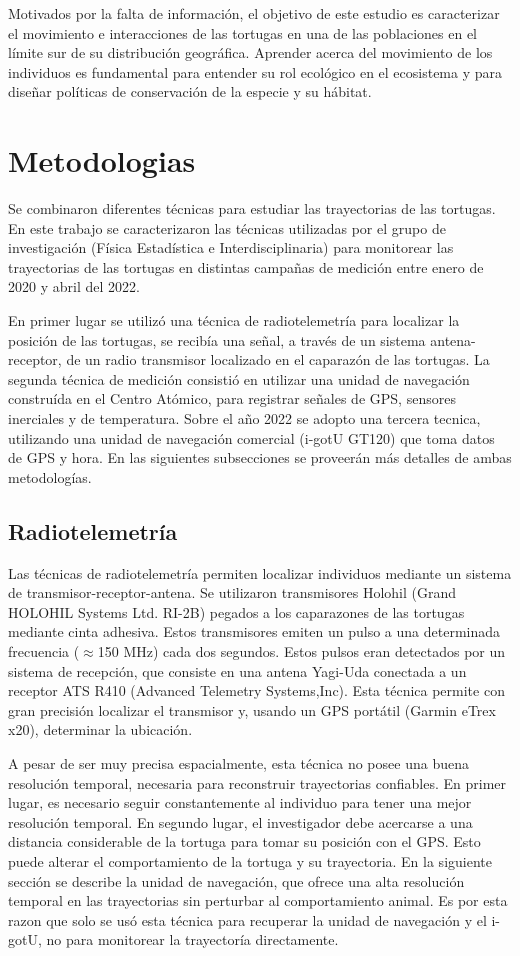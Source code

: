 Motivados por la falta de información, el objetivo de este estudio es caracterizar el movimiento e interacciones de las tortugas en una de las poblaciones en el límite sur de su distribución geográfica. Aprender acerca del movimiento de los individuos es fundamental para entender su rol ecológico en el ecosistema y para diseñar políticas de conservación de la especie y su hábitat.


\section{Metodologias}

Se combinaron diferentes técnicas para estudiar las trayectorias de las tortugas. En este trabajo se caracterizaron las técnicas utilizadas por el grupo de investigación (Física Estadística e Interdisciplinaria) para monitorear las trayectorias de las tortugas en distintas campañas de medición entre enero de 2020 y abril del 2022.
 
En primer lugar se utilizó una técnica de radiotelemetría para localizar la posición de las tortugas, se recibía una señal, a través de un sistema antena-receptor, de un radio transmisor localizado en el caparazón de las tortugas. La segunda técnica de medición consistió en utilizar una unidad de navegación construída en el Centro Atómico, para registrar señales de GPS, sensores inerciales y de temperatura. Sobre el año 2022 se adopto una tercera tecnica, utilizando una unidad de navegación comercial (i-gotU GT120) que toma datos de GPS y hora. En las siguientes subsecciones se proveerán más detalles de ambas metodologías. 
 
\subsection{Radiotelemetría}
Las técnicas de radiotelemetría permiten localizar individuos mediante un sistema de transmisor-receptor-antena. Se utilizaron transmisores Holohil (Grand HOLOHIL Systems Ltd. RI-2B) pegados a los caparazones de las tortugas mediante cinta adhesiva. Estos transmisores emiten un pulso a una determinada frecuencia ($\approx$150 MHz) cada dos segundos. Estos pulsos eran detectados por un sistema de recepción, que consiste en una antena Yagi-Uda conectada a un receptor ATS R410 (Advanced Telemetry Systems,Inc). Esta técnica permite con gran precisión localizar el transmisor y, usando un GPS portátil (Garmin eTrex
x20), determinar la ubicación.
 
A pesar de ser muy precisa espacialmente, esta técnica no posee una buena resolución temporal, necesaria para reconstruir trayectorias confiables. En primer lugar, es necesario seguir constantemente al individuo para tener una mejor resolución temporal. En segundo lugar, el investigador debe acercarse a una distancia considerable de la tortuga para tomar su posición con el GPS. Esto puede alterar el comportamiento de la tortuga y su trayectoria. En la siguiente sección se describe la unidad de navegación, que ofrece una alta resolución temporal en las trayectorias sin perturbar al comportamiento animal. Es por esta razon que solo se usó esta técnica para recuperar la unidad de navegación y el i-gotU, no para monitorear la trayectoría directamente.
 
